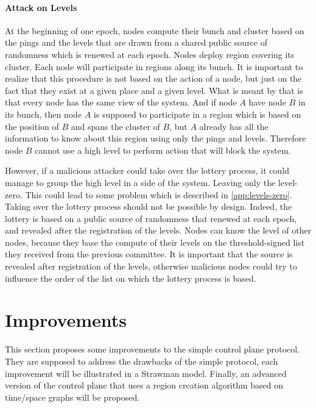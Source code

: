 \documentclass[a4paper,11pt,oneside]{report}
\begin{document}
\subsubsection{Attack on Levels} \label{sec:ControlePlane-Threat-Model}
At the beginning of one epoch, nodes compute their bunch and cluster based on
the pings and the levels that are drawn from a shared public source of randomness
which is renewed at each epoch. Nodes deploy region covering its cluster. Each
node will participate in regions along its bunch. It is important to realize that this procedure  is
not based on the action of a node, but just on the fact that they exist at a
given place and a given level. What is meant by that is that every node has
the same view of the system. And if node $A$ have node $B$ in its bunch, then
node $A$ is supposed to participate in a region which is based on the position
of $B$ and spans the cluster of $B$, but $A$ already has all the information
to know about this region using only the pings and levels. Therefore node $B$
cannot use a high level to perform action that will block the system. 

However, if a malicious attacker could take over the lottery process, it could
manage to group the high level in a side of the system. Leaving only the
level-zero. This could lead to some problem which is described in \autoref{app:levels-zero}.
Taking over the lottery process should not be possible by design.  Indeed, the
lottery is based on a public source of randomness that renewed at each epoch,
and revealed after the registration of the levels. Nodes can know the level of
other nodes, because they base the compute of their levels on the
threshold-signed list they received from the previous committee.  It is
important that the source is revealed after registration of the levels,
otherwise malicious nodes could try to influence the order of the list on which
the lottery process is based. 

\chapter{Improvements} \label{chap:Improvements}  %

This section proposes some improvements to the simple control plane protocol. They
are supposed to address the drawbacks of the simple protocol, each improvement
will be illustrated in a Strawman model. Finally, an advanced
version of the control plane that uses a region creation algorithm based on
time/space graphs will be proposed. 
\end{document}
